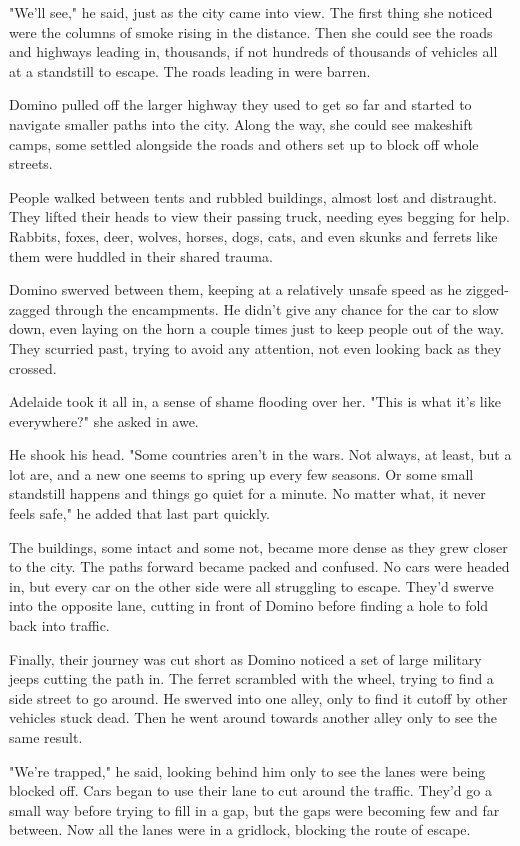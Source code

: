 "We'll see," he said, just as the city came into view. The first thing she noticed were the columns of smoke rising in the distance. Then she could see the roads and highways leading in, thousands, if not hundreds of thousands of vehicles all at a standstill to escape. The roads leading in were barren.

Domino pulled off the larger highway they used to get so far and started to navigate smaller paths into the city. Along the way, she could see makeshift camps, some settled alongside the roads and others set up to block off whole streets.

People walked between tents and rubbled buildings, almost lost and distraught. They lifted their heads to view their passing truck, needing eyes begging for help. Rabbits, foxes, deer, wolves, horses, dogs, cats, and even skunks and ferrets like them were huddled in their shared trauma.

Domino swerved between them, keeping at a relatively unsafe speed as he zigged-zagged through the encampments. He didn't give any chance for the car to slow down, even laying on the horn a couple times just to keep people out of the way. They scurried past, trying to avoid any attention, not even looking back as they crossed.

Adelaide took it all in, a sense of shame flooding over her. "This is what it's like everywhere?" she asked in awe.

He shook his head. "Some countries aren't in the wars. Not always, at least, but a lot are, and a new one seems to spring up every few seasons. Or some small standstill happens and things go quiet for a minute. No matter what, it never feels safe," he added that last part quickly.

The buildings, some intact and some not, became more dense as they grew closer to the city. The paths forward became packed and confused. No cars were headed in, but every car on the other side were all struggling to escape. They'd swerve into the opposite lane, cutting in front of Domino before finding a hole to fold back into traffic.

Finally, their journey was cut short as Domino noticed a set of large military jeeps cutting the path in. The ferret scrambled with the wheel, trying to find a side street to go around. He swerved into one alley, only to find it cutoff by other vehicles stuck dead. Then he went around towards another alley only to see the same result.

"We're trapped," he said, looking behind him only to see the lanes were being blocked off. Cars began to use their lane to cut around the traffic. They'd go a small way before trying to fill in a gap, but the gaps were becoming few and far between. Now all the lanes were in a gridlock, blocking the route of escape.

